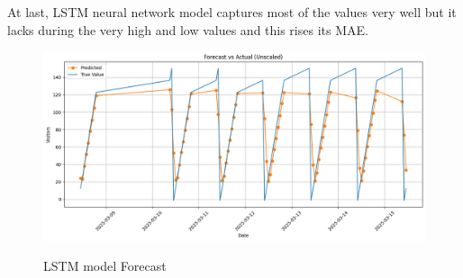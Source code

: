 \documentclass{article}
\begin{document}
At last, LSTM neural network model captures most of the values very well but it lacks during the very high and low values and this rises its MAE.

\begin{figure}[h]
\includegraphics[width=1\linewidth]{images/neural_forecast.png}
    \label{fig:mesh1}
    \caption{LSTM model Forecast}
\end{figure}
\newpage
\end{document}
